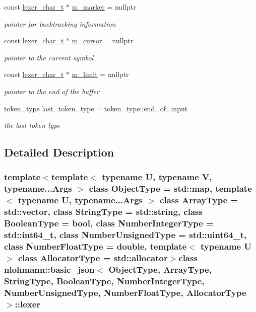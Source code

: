 \begin{DoxyCompactItemize}
const \hyperlink{classnlohmann_1_1basic__json_1_1lexer_a7858ae971d07f21ad47fa8a0421001db}{lexer\+\_\+char\+\_\+t} $\ast$ \hyperlink{classnlohmann_1_1basic__json_1_1lexer_a996cc0634a78006085d2e9a5c0c8ecb7}{m\+\_\+marker} = nullptr
\begin{DoxyCompactList}\small\item\em pointer for backtracking information \end{DoxyCompactList}\item 
const \hyperlink{classnlohmann_1_1basic__json_1_1lexer_a7858ae971d07f21ad47fa8a0421001db}{lexer\+\_\+char\+\_\+t} $\ast$ \hyperlink{classnlohmann_1_1basic__json_1_1lexer_a990b28993e1136d8a859ced7223ea592}{m\+\_\+cursor} = nullptr
\begin{DoxyCompactList}\small\item\em pointer to the current symbol \end{DoxyCompactList}\item 
const \hyperlink{classnlohmann_1_1basic__json_1_1lexer_a7858ae971d07f21ad47fa8a0421001db}{lexer\+\_\+char\+\_\+t} $\ast$ \hyperlink{classnlohmann_1_1basic__json_1_1lexer_ab9a9a6d80fcbed465af205f643df5376}{m\+\_\+limit} = nullptr
\begin{DoxyCompactList}\small\item\em pointer to the end of the buffer \end{DoxyCompactList}\item 
\hyperlink{classnlohmann_1_1basic__json_1_1lexer_a96887d6cd131e3d3a85a9d71fbdbcdf7}{token\+\_\+type} \hyperlink{classnlohmann_1_1basic__json_1_1lexer_a1593a0456753134a4a558bb55cc21125}{last\+\_\+token\+\_\+type} = \hyperlink{classnlohmann_1_1basic__json_1_1lexer_a96887d6cd131e3d3a85a9d71fbdbcdf7aca11f56dd477c09e06583dbdcda0985f}{token\+\_\+type\+::end\+\_\+of\+\_\+input}
\begin{DoxyCompactList}\small\item\em the last token type \end{DoxyCompactList}\end{DoxyCompactItemize}


\subsection{Detailed Description}
\subsubsection*{template$<$template$<$ typename U, typename V, typename...\+Args $>$ class Object\+Type = std\+::map, template$<$ typename U, typename...\+Args $>$ class Array\+Type = std\+::vector, class String\+Type = std\+::string, class Boolean\+Type = bool, class Number\+Integer\+Type = std\+::int64\+\_\+t, class Number\+Unsigned\+Type = std\+::uint64\+\_\+t, class Number\+Float\+Type = double, template$<$ typename U $>$ class Allocator\+Type = std\+::allocator$>$class nlohmann\+::basic\+\_\+json$<$ Object\+Type, Array\+Type, String\+Type, Boolean\+Type, Number\+Integer\+Type, Number\+Unsigned\+Type, Number\+Float\+Type, Allocator\+Type $>$\+::lexer}

